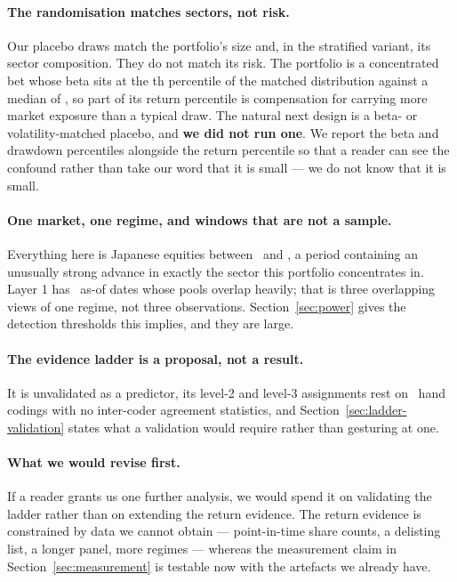 \documentclass[a4paper,11pt]{article}
\begin{document}
\paragraph{The randomisation matches sectors, not risk.} Our placebo draws match the portfolio's size
and, in the stratified variant, its sector composition. They do not match its risk. The portfolio is a
concentrated bet whose beta sits at the \LtwoMatchedBetaPctile th percentile of the matched
distribution against a median of \LtwoMatchedBetaMedian, so part of its return percentile is
compensation for carrying more market exposure than a typical draw. The natural next design is a
beta- or volatility-matched placebo, and \textbf{we did not run one}. We report the beta and drawdown
percentiles alongside the return percentile so that a reader can see the confound rather than take our
word that it is small --- we do not know that it is small.

\paragraph{One market, one regime, and windows that are not a sample.} Everything here is Japanese
equities between \SurvStart\ and \SurvEnd, a period containing an unusually strong advance in exactly
the sector this portfolio concentrates in. Layer 1 has \LoneNasof\ as-of dates whose pools overlap
heavily; that is three overlapping views of one regime, not three observations. Section~\ref{sec:power}
gives the detection thresholds this implies, and they are large.

\paragraph{The evidence ladder is a proposal, not a result.} It is unvalidated as a predictor, its
level-2 and level-3 assignments rest on \LadderVerified\ hand codings with no inter-coder agreement
statistics, and Section~\ref{sec:ladder-validation} states what a validation would require rather
than gesturing at one.

\paragraph{What we would revise first.} If a reader grants us one further analysis, we would spend it
on validating the ladder rather than on extending the return evidence. The return evidence is
constrained by data we cannot obtain --- point-in-time share counts, a delisting list, a longer panel,
more regimes --- whereas the measurement claim in Section~\ref{sec:measurement} is testable now with
the artefacts we already have.
\end{document}
